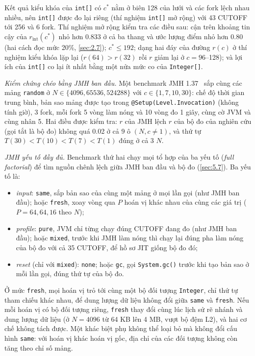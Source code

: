 \documentclass[12pt,a4paper]{article}
\begin{document}
Kết quả kiểu khóa của \texttt{int[]} có $c^*$ nằm ở biên 128 của lưới và các fork lệch nhau nhiều, nên \texttt{int[]} được đo lại riêng (thí nghiệm \texttt{int[]} mở rộng) với 43 CUTOFF tới 256 và 6 fork. Thí nghiệm mở rộng kiểm tra các điều sau: cận trên khoảng tin cậy của $r_{\text{int}}(c^*)$ nhỏ hơn 0.833 ở cả ba thang và ước lượng điểm nhỏ hơn 0.80 (hai cách đọc mức 20\%, \cref{sec:2.7}); $c^* \le 192$; dạng hai đáy của đường $r(c)$ ở thí nghiệm kiểu khóa lặp lại ($r(64) > r(32)$ rồi $r$ giảm lại ở $c = 96$--128); và lợi ích của \texttt{int[]} co lại ít nhất bằng một nửa mức co của \texttt{Integer[]}.

\emph{Kiểm chứng chéo bằng JMH ban đầu.} Một benchmark JMH 1.37~\citep{jmh} sắp cùng các mảng \texttt{random} ở $N \in \{4096, \num{65536}, \num{524288}\}$ với $c \in \{1, 7, 10, 30\}$: chế độ thời gian trung bình, bản sao mảng được tạo trong \texttt{@Setup(Level.Invocation)} (không tính giờ), 3 fork, mỗi fork 5 vòng làm nóng và 10 vòng đo 1 giây, cùng cờ JVM và cùng nhân 5. Hai điều được kiểm tra: $r$ của JMH lệch $r$ của bộ đo của nghiên cứu (gọi tắt là bộ đo) không quá 0.02 ở cả 9 ô $(N, c \ne 1)$, và thứ tự $T(30) < T(10) < T(7) < T(1)$ đúng ở cả 3 $N$.

\emph{JMH yếu tố đầy đủ.} Benchmark thứ hai chạy mọi tổ hợp của ba yếu tố (\emph{full factorial}) để tìm nguồn chênh lệch giữa JMH ban đầu và bộ đo (\cref{sec:5.7}). Ba yếu tố là:
\begin{itemize}
\item \emph{input}: \texttt{same}, sắp bản sao của cùng một mảng ở mọi lần gọi (như JMH ban đầu); hoặc \texttt{fresh}, xoay vòng qua $P$ hoán vị khác nhau của cùng các giá trị ($P = 64, 64, 16$ theo $N$);
\item \emph{profile}: \texttt{pure}, JVM chỉ từng chạy đúng CUTOFF đang đo (như JMH ban đầu); hoặc \texttt{mixed}, trước khi JMH làm nóng thì chạy lại đúng pha làm nóng của bộ đo với cả 35 CUTOFF, để hồ sơ JIT giống bộ đo đó;
\item \emph{reset} (chỉ với \texttt{mixed}): \texttt{none}; hoặc \texttt{gc}, gọi \texttt{System.gc()} trước khi tạo bản sao ở mỗi lần gọi, đúng thứ tự của bộ đo.
\end{itemize}
Ở mức \texttt{fresh}, mọi hoán vị trỏ tới cùng một bộ đối tượng \texttt{Integer}, chỉ thứ tự tham chiếu khác nhau, để dung lượng dữ liệu không đổi giữa \texttt{same} và \texttt{fresh}. Nếu mỗi hoán vị có bộ đối tượng riêng, \texttt{fresh} thay đổi cùng lúc lịch sử rẽ nhánh và dung lượng dữ liệu (ở $N = 4096$ từ 64 KB lên 4 MB, vượt bộ đệm L2), và hai cơ chế không tách được. Một khác biệt phụ không thể loại bỏ mà không đổi cấu hình \texttt{same}: với hoán vị khác hoán vị gốc, địa chỉ của các đối tượng không còn tăng theo chỉ số mảng.
\end{document}
